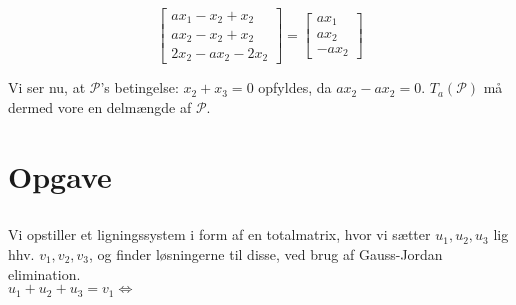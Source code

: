 \documentclass[a4paper,12pt]{article}
\begin{document}
\[
\left[\begin{array}{ccc}
    ax_1  -x_2 + x_2\\
    ax_2 - x_2 + x_2\\
     2x_2 - ax_2 - 2x_2
\end{array}\right]
=
\left[\begin{array}{ccc}
    ax_1\\
    ax_2\\
    - ax_2
\end{array}\right]
\]

Vi ser nu, at $\mathcal{P}$'s betingelse: $x_2 + x_3 = 0$ opfyldes, da $ax_2 - ax_2 = 0$. $T_a(\mathcal{P})$ må dermed vore en delmængde af $\mathcal{P}$.


\section[Opgave]{Opgave}
\subsection{}
Vi opstiller et ligningssystem i form af en totalmatrix, hvor vi sætter $u_1, u_2, u_3$ lig hhv. $v_1, v_2, v_3$, og finder løsningerne til disse, ved brug af Gauss-Jordan elimination.\\

$u_1 + u_2 + u_3 = v_1 \Leftrightarrow$\\
\end{document}
